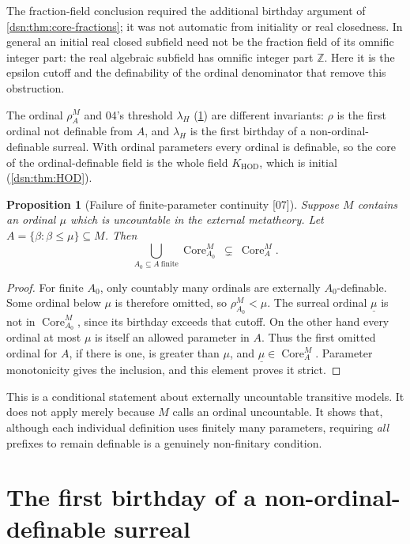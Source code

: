 \documentclass[11pt,a4paper]{article}
\numberwithin{equation}{section}
\newtheorem{proposition}[proposition]{Proposition}
\theoremstyle{definition}
\theoremstyle{remark}
\newcommand{\HOD}{\mathrm{HOD}}
\newcommand{\Z}{\mathbb Z}
\newcommand{\Core}{\operatorname{Core}}
\newcommand{\KH}{K_{\HOD}}
\newcommand{\src}[1]{\textup{\textsf{\small[#1]}}}
\begin{document}
The fraction-field conclusion required the additional birthday argument of
\cref{dsn:thm:core-fractions}; it was not automatic from initiality or real
closedness. In general an initial real closed subfield need not be the
fraction field of its omnific integer part: the real algebraic subfield has
omnific integer part $\Z$. Here it is the epsilon cutoff and the
definability of the ordinal denominator that remove this obstruction.

The ordinal $\rho^M_A$ and 04's threshold $\lambda_H$
(\cref{dsn:sec:firstbirthday}) are different invariants: $\rho$ is the
first ordinal not definable from $A$, and $\lambda_H$ is the first birthday
of a non-ordinal-definable surreal. With ordinal parameters every ordinal
is definable, so the core of the ordinal-definable field is the whole
field $\KH$, which is initial (\cref{dsn:thm:HOD}).

\begin{proposition}[Failure of finite-parameter continuity \src{07}]\label{dsn:prop:parameter-discontinuity}
Suppose $M$ contains an ordinal $\mu$ which is uncountable in the external
metatheory. Let $A=\{\beta:\beta\le\mu\}\subseteq M$. Then
\[
 \bigcup_{A_0\subseteq A\ \mathrm{finite}}\Core^M_{A_0}
 \ \subsetneq\ \Core^M_A.
\]
\end{proposition}
\begin{proof}
For finite $A_0$, only countably many ordinals are externally
$A_0$-definable. Some ordinal below $\mu$ is therefore omitted, so
$\rho^M_{A_0}<\mu$. The surreal ordinal $\underline\mu$ is not in
$\Core^M_{A_0}$, since its birthday exceeds that cutoff. On the other hand
every ordinal at most $\mu$ is itself an allowed parameter in $A$. Thus the
first omitted ordinal for $A$, if there is one, is greater than $\mu$, and
$\underline\mu\in\Core^M_A$. Parameter monotonicity gives the inclusion,
and this element proves it strict.
\end{proof}

This is a conditional statement about externally uncountable transitive
models. It does not apply merely because $M$ calls an ordinal uncountable.
It shows that, although each individual definition uses finitely many
parameters, requiring \emph{all} prefixes to remain definable is a
genuinely non-finitary condition.

\section{The first birthday of a non-ordinal-definable surreal}
\label{dsn:sec:firstbirthday}
\end{document}
